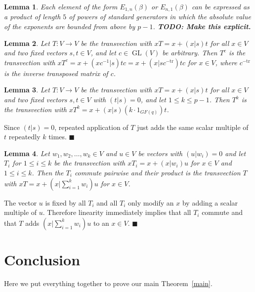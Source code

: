\documentclass[a4paper,11pt]{article}
\def\GL{\operatorname{GL}}
\newcommand{\fixme}[1]{\textbf{#1}}
\newcommand{\tr}{\mathrm{tr}}
\newcommand{\proofend}{\hfill$\blacksquare$}
\newtheorem{lemma}{Lemma}
\begin{document}
\begin{lemma}
\label{transvecs}
Each element of the form $E_{1,n}(\beta)$ or $E_{n,1}(\beta)$ can be
expressed as a product of length $5$ of powers of standard generators
in which the absolute value of the exponents are bounded from above 
by $p-1$. \fixme{TODO: Make this explicit.}
\end{lemma}

\begin{lemma}
\label{conjtransv}
Let $T : V \to V$ be the transvection with $xT = x+(x|s)t$ for all
$x \in V$ and two fixed vectors $s,t \in V$, and let 
$c \in \GL(V)$ be arbitrary. 
Then $T^c$ is the transvection with $xT^c = x + (xc^{-1}|s)tc
= x + (x|sc^{-\tr})tc$ for $x \in V$, 
where $c^{-\tr}$ is the inverse transposed matrix of $c$.
\end{lemma}

\begin{lemma}
\label{powertrans}
Let $T : V \to V$ be the transvection with $xT = x+(x|s)t$ for all
$x \in V$ and two fixed vectors $s,t \in V$ with $(t|s)=0$, and let 
$1 \le k \le p-1$. Then $T^k$ is the transvection
with $xT^k = x + (x|s)(k\cdot 1_{GF(q)}) t$.
\end{lemma}
\proof Since $(t|s)=0$, repeated application of $T$ just adds the same
scalar multiple of $t$ repeatedly $k$ times.
\proofend

\begin{lemma}
\label{lincombtrans}
Let $w_1, w_2, \ldots, w_k \in V$ and $u \in V$ be vectors with 
$(u|w_i)=0$ and let $T_i$ for $1 \le
i \le k$ be the transvection with $xT_i = x + (x|w_i)u$ for $x \in V$
and $1 \le i \le k$. 
Then the $T_i$ commute pairwise and their product is the transvection $T$
with $xT = x + (x|\sum_{i=1}^k w_i) u$ for $x \in V$.
\end{lemma}
\proof The vector $u$ is fixed by all $T_i$ and all $T_i$ only modify
an $x$ by adding a scalar multiple of $u$. Therefore linearity
immediately implies that all $T_i$ commute and that $T$ adds
$(x|\sum_{i=1}^k w_i)u$ to an $x \in V$.
\proofend

\section{Conclusion}

Here we put everything together to prove our main Theorem~\ref{main}.
\end{document}
